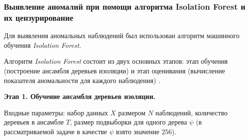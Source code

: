 \documentclass[14pt,a4paper]{extarticle}
\begin{document}
\subsubsection{Выявление аномалий при помощи алгоритма Isolation Forest и их цензурирование}

Для выявления аномальных наблюдений был использован алгоритм машинного обучения \textit{Isolation Forest}.

Алгоритм \textit{Isolation Forest} состоит из двух основных этапов: этап обучения 
(построение ансамбля деревьев изоляции) и этап оценивания (вычисление показателя аномальности для 
каждого наблюдения) \cite{liu2008}.

\textbf{Этап 1. Обучение ансамбля деревьев изоляции.}

Входные параметры: набор данных $X$ размером $N$ наблюдений, количество деревьев в ансамбле $T$, размер 
подвыборки для одного дерева $\psi$ (в рассматриваемой задаче в качестве $\psi$ взято значение $256$).
\end{document}
